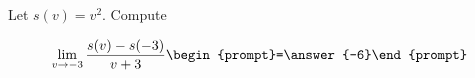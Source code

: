 \documentclass{ximera}
\author{Bart Snapp}
\begin{document}
\begin{exercise}
Let $s(v) = v^2$. Compute

\[
\lim_{ v\to -3 } 
\frac{s(v)-s(-3)}{v+3} \begin{prompt}=\answer{-6}\end{prompt}
\]
\end{exercise}
\end{document}
